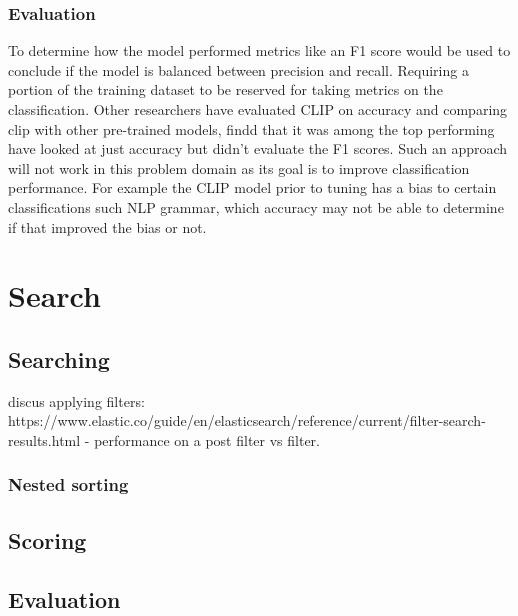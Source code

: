 \documentclass[letterpaper, 10 pt, conference]{ieeeconf}  %
\begin{document}
\subsubsection{Evaluation}
To determine how the model performed metrics like an F1 score would be used to conclude if the model 
is balanced between precision and recall. Requiring a portion of the training dataset to be reserved for 
taking metrics on the classification. Other researchers have evaluated CLIP on accuracy and comparing clip 
with other pre-trained models, findd that it was among the top performing have looked at just accuracy 
\cite{FT-clip} but didn't evaluate the F1 scores.  Such an approach will not work in this problem domain 
as its goal is to improve classification performance. For example the CLIP model prior to tuning has a bias 
to certain classifications such NLP grammar, which accuracy may not be able to determine if that improved 
the bias or not.





\section{Search}
\subsection{Searching}
discus applying filters: https://www.elastic.co/guide/en/elasticsearch/reference/current/filter-search-results.html
  - performance on a post filter vs filter.
\subsubsection{Nested sorting}
\subsection{Scoring}

\subsection{Evaluation}


\end{document}

